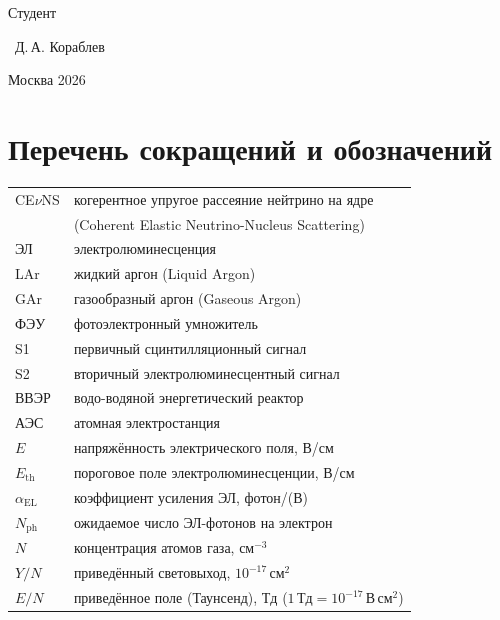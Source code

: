 \documentclass[12pt]{article}
\begin{document}
\begin{titlepage}
\begin{center}
    \begin{minipage}[b][2\baselineskip][b]{0.4\linewidth}
      Студент
    \end{minipage}
    \hfill
    \begin{minipage}[b][2\baselineskip][b]{0.4\linewidth}
      \underline{\hspace{2cm}}~Д.\,А. Кораблев
    \end{minipage}

    \vfill
    Москва 2026
  \end{center}
\end{titlepage}

\newpage
\tableofcontents
\setcounter{page}{3}

\newpage
\section*{Перечень сокращений и обозначений}

\begin{tabular}{ll}
  CE$\nu$NS & когерентное упругое рассеяние нейтрино на ядре \\
            & (Coherent Elastic Neutrino-Nucleus Scattering) \\
  ЭЛ        & электролюминесценция \\
  LAr       & жидкий аргон (Liquid Argon) \\
  GAr       & газообразный аргон (Gaseous Argon) \\
  ФЭУ       & фотоэлектронный умножитель \\
  S1        & первичный сцинтилляционный сигнал \\
  S2        & вторичный электролюминесцентный сигнал \\
  ВВЭР      & водо-водяной энергетический реактор \\
  АЭС       & атомная электростанция \\
  $E$       & напряжённость электрического поля, В/см \\
  $E_\text{th}$ & пороговое поле электролюминесценции, В/см \\
  $\alpha_\text{EL}$ & коэффициент усиления ЭЛ, фотон/(В) \\
  $N_\text{ph}$ & ожидаемое число ЭЛ-фотонов на электрон \\
  $N$       & концентрация атомов газа, см$^{-3}$ \\
  $Y/N$     & приведённый световыход, $10^{-17}$\,см$^2$ \\
  $E/N$     & приведённое поле (Таунсенд), Тд ($1\,\text{Тд} = 10^{-17}$\,В\,см$^2$) \\
\end{tabular}
\end{document}
